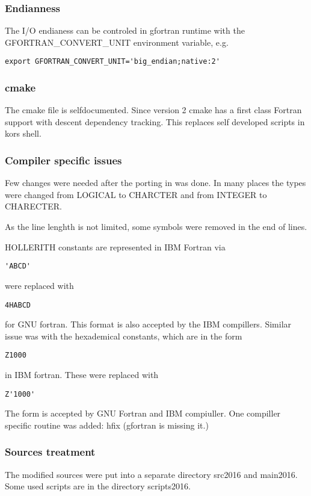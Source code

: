 \subsubsection{Endianness}
The I/O endianess  can be controled in gfortran runtime with the 
GFORTRAN\_CONVERT\_UNIT environment variable, e.g.
\begin{verbatim}
export GFORTRAN_CONVERT_UNIT='big_endian;native:2'
\end{verbatim}

\subsubsection{cmake}
The cmake file is selfdocumented.
Since version 2 cmake  has a first class Fortran support with descent dependency tracking.
This replaces self developed scripts in kors shell.

\subsubsection{Compiler specific issues}
Few changes were needed after the porting in   was done.
In many places the types were changed from LOGICAL to CHARCTER
and from INTEGER to CHARECTER.

As the line lenghth is not limited, some symbols were removed in the end of lines.

HOLLERITH constants are represented in IBM Fortran via
\begin{verbatim}
'ABCD'
\end{verbatim}
were replaced with
\begin{verbatim}
4HABCD
\end{verbatim}
for GNU fortran. This format is also accepted by the IBM compillers.
Similar issue was with the hexademical constants, which are in the form 
\begin{verbatim}
Z1000
\end{verbatim}
in IBM fortran. These were replaced with 
\begin{verbatim}
Z'1000'
\end{verbatim}
The form is accepted by GNU Fortran and IBM compiuller.
One compiller specific routine was added: hfix (gfortran is missing it.)

\subsubsection{Sources treatment}
The modified  sources were put into a separate directory src2016 and main2016.
Some used scripts are in the directory scripts2016.


